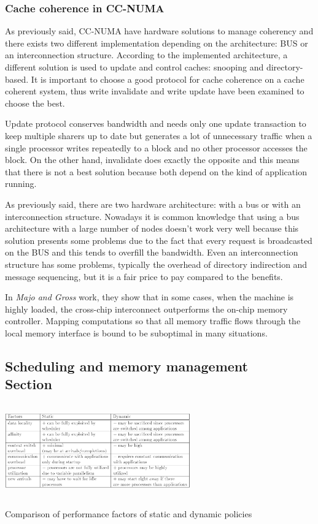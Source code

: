 \documentclass[a4paper,10pt]{article}
\makeatletter
\newenvironment{figurehere}{\def\@captype{figure}\vspace{2ex}}{\vspace{2ex}}
\makeatother
\begin{document}
\begin{multicols}{2}
\subsubsection{Cache coherence in CC-NUMA}
As previously said, CC-NUMA have hardware solutions to manage coherency and there exists two different implementation depending on the architecture: BUS or an interconnection structure. According to the implemented architecture, a different solution is used to update and control caches: snooping and directory-based. It is important to choose a good protocol for cache coherence on a cache coherent system, thus write invalidate and write update have been examined to choose the best.\par
\parindent 10mm Update protocol conserves bandwidth and needs only one update  transaction to keep multiple sharers up to date but generates a lot of unnecessary traffic when a single processor writes  repeatedly to a block and no other processor accesses the block. On the other hand, invalidate does exactly the opposite and this means that there is not a best solution because both depend on the kind of application running.\par
\parindent 10mm As previously said, there are two hardware architecture: with a bus or with an interconnection structure. Nowadays it is common knowledge that using a bus architecture with a large number of nodes doesn't work very well because this solution presents some problems due to the fact that every request is broadcasted on the BUS and this tends to overfill the bandwidth. Even an interconnection structure has some problems, typically the overhead of directory indirection and message sequencing, but it is a fair price to pay compared to the benefits.\cite{moh}\par
\parindent 10mm In \emph{Majo and Gross} work, they show that in some cases, when the machine is highly loaded, the cross-chip interconnect outperforms the on-chip memory controller. Mapping computations so that all memory traffic flows through the local memory interface is bound to be suboptimal in many situations. \cite{Majo_memorysystem}

\subsection{Scheduling and memory management \\ Section}

\begin{figurehere}
 \centering
 \includegraphics[width=8cm, height=4cm]{./eps/tabella.png}
 \caption{Comparison of performance factors of static and dynamic policies}
 \label{fig:tabella}
\end{figurehere}



\end{multicols}
\end{document}
